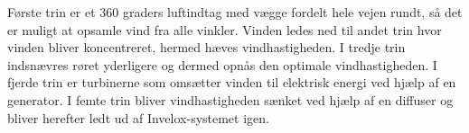 Første trin er et 360 graders luftindtag med vægge fordelt hele vejen rundt, så det er muligt at opsamle vind fra alle vinkler. Vinden ledes ned til andet trin hvor vinden bliver koncentreret, hermed hæves vindhastigheden. I tredje trin indsnævres røret yderligere og dermed opnås den optimale vindhastigheden. I fjerde trin er turbinerne som omsætter vinden til elektrisk energi ved hjælp af en generator. I femte trin bliver vindhastigheden sænket ved hjælp af en diffuser og bliver herefter ledt ud af Invelox-systemet igen. 
